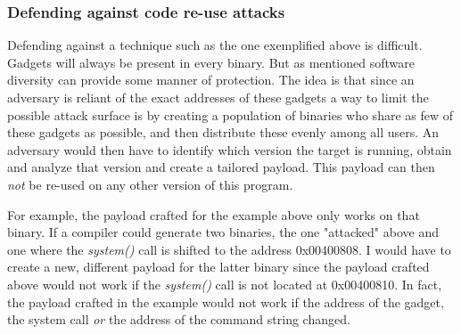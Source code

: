 \subsubsection{Defending against code re-use attacks}

Defending against a technique such as the one exemplified above is difficult. Gadgets will
always be present in every binary. But as mentioned software diversity can provide some
manner of protection. The idea is that since an adversary is reliant of the exact
addresses of these gadgets a way to limit the possible attack surface is by creating a
population of binaries who share as few of these gadgets as possible, and then distribute
these evenly among all users. An adversary would then have to identify which version the
target is running, obtain and analyze that version and create a tailored payload. This
payload can then \textit{not} be re-used on any other version of this program.

For example, the payload crafted for the example above only works on that binary. If a
compiler could generate two binaries, the one "attacked" above and one where the
\textit{system()} call is shifted to the address 0x00400808. I would have to create a new,
different payload for the latter binary since the payload crafted above would not work if
the \textit{system()} call is not located at 0x00400810. In fact, the payload crafted in
the example would not work if the address of the gadget, the system call \textit{or} the
address of the command string changed.
